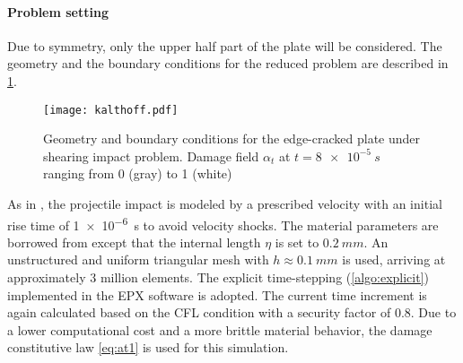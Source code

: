 \paragraph{Problem setting} Due to symmetry, only the upper half part of the plate will be considered. The geometry and the boundary conditions for the reduced problem are described in \cref{fig:kalthoff}.
\begin{figure}[htbp]
\centering
\texttt{[image: kalthoff.pdf]}
\caption{Geometry and boundary conditions for the edge-cracked plate under shearing impact problem. Damage field $\alpha_t$ at $t=\SI{8e-5}{s}$ ranging from 0 (gray) to 1 (white)} \label{fig:kalthoff}
\end{figure}
As in \cite{BordenVerhooselScottHughesLandis:2012,HofackerMiehe:2012}, the projectile impact is modeled by a prescribed velocity with an initial rise time of \SI{1e-6}{s} to avoid velocity shocks. The material parameters are borrowed from \cite{BordenVerhooselScottHughesLandis:2012} except that the internal length $\eta$ is set to $\SI{0.2}{mm}$. An unstructured and uniform triangular mesh with $h\approx \SI{0.1}{mm}$ is used, arriving at approximately 3 million elements. The explicit time-stepping (\cref{algo:explicit}) implemented in the EPX software is adopted. The current time increment is again calculated based on the CFL condition with a security factor of 0.8. Due to a lower computational cost and a more brittle material behavior, the damage constitutive law \eqref{eq:at1} is used for this simulation.

